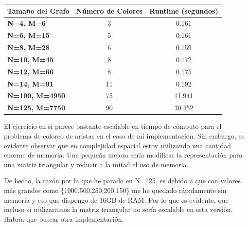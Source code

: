 \documentclass[12pt,letterpaper]{article}
\numberwithin{equation}{section} %
\numberwithin{figure}{section} %
\numberwithin{table}{section} %
\begin{document}
\begin{table}[H]
    \centering
\begin{tabular}{|l|c|c|}
\hline
\textbf{Tamaño del Grafo} & \textbf{Número de Colores} & \textbf{Runtime (segundos)} \\ \hline
\textbf{N=4, M=6}         & 3                          & 0.161                       \\ \hline
\textbf{N=6, M=15}        & 5                          & 0.161                       \\ \hline
\textbf{N=8, M=28}        & 6                          & 0.159                       \\ \hline
\textbf{N=10, M=45}       & 8                          & 0.172                       \\ \hline
\textbf{N=12, M=66}       & 8                          & 0.175                       \\ \hline
\textbf{N=14, M=91}       & 11                         & 0.192                       \\ \hline
\textbf{N=100, M=4950}    & 75                         & 11.941                      \\ \hline
\textbf{N=125, M=7750}    & 90                         & 30.452                      \\ \hline
\end{tabular}
\end{table}

El ejercicio en si parece bastante escalable en tiempo
de cómputo para el problema de coloreo de aristas en el caso de mi implementación.
Sin embargo, es evidente observar que en complejidad espacial estoy utilizando
una cantidad enorme de memoria. Una pequeña mejora sería modificar la representación
para una matriz triangular y reducir a la mitad el uso de memoria.
\par
De hecho, la razón por la que he parado en N=125, es debido a que con valores
más grandes como \{1000,500,250,200,150\} me he quedado rápidamente sin memoria
y eso que dispongo de 16GB de RAM. Por lo que es evidente, que incluso si utilizaramos
la matriz triangular no sería escalable en esta versión.
Habría que buscar otra implementación.
\end{document}
